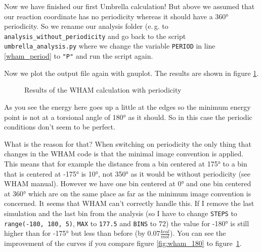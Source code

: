 \documentclass[a4paper,11pt]{scrartcl}
\begin{document}
Now we have finished our first Umbrella calculation! But above we assumed that our reaction coordinate has no periodicity whereas it should have a 360° periodicity. So we rename our analysis folder (e.\,g. to \texttt{analysis\_without\_periodicity} and go back to the script \texttt{umbrella\_analysis.py} where we change the variable \texttt{PERIOD} in line \ref{wham_period} to \texttt{"P"} and run the script again.

Now we plot the output file again with gnuplot. The results are shown in figure \ref{fig:wham_result_period}.

\begin{figure} [htb]
	\caption{Results of the WHAM calculation with periodicity}
	\label{fig:wham_result_period}
\end{figure} 

As you see the energy here goes up a little at the edges so the minimum energy point is not at a torsional angle of 180° as it should. So in this case the periodic conditions don't seem to be perfect.

What is the reason for that? When switching on periodicity the only thing that changes in the WHAM code is that the minimal image convention is applied. This means that for example the distance from a bin centered at 175° to a bin that is centered at -175° is 10°, not 350° as it would be without periodicity (see WHAM manual). However we have one bin centered at 0° and one bin centered at 360° which are on the same place as far as the minimum image convention is concerned. It seems that WHAM can't correctly handle this. If I remove the last simulation and the last bin from the analysis (so I have to change \texttt{STEPS} to \texttt{range(-180, 180, 5)}, \texttt{MAX} to \texttt{177.5} and \texttt{BINS} to 72) the value for -180° is still higher than for -175° but less than before (by $0.07 \frac{kcal}{mol}$). You can see the improvement of the curves if you compare figure \ref{fig:wham_180} to \mbox{figure \ref{fig:wham_result_period}}.
\end{document}
